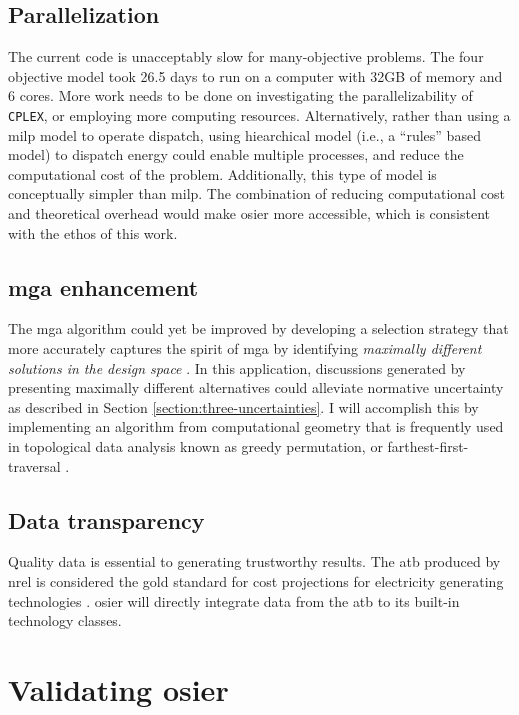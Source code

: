 \subsection{Parallelization}

The current code is unacceptably slow for many-objective problems. The four
objective model took 26.5 days to run on a computer with 32GB of memory and 6
cores. More work needs to be done on investigating the parallelizability of
\texttt{CPLEX}, or employing more computing resources. Alternatively, rather
than using a \ac{milp} model to operate dispatch, using hiearchical model (i.e.,
a ``rules'' based model) to dispatch energy could enable multiple processes, and
reduce the computational cost of the problem. Additionally, this type of model
is conceptually simpler than \ac{milp}. The combination of reducing
computational cost and theoretical overhead would make \ac{osier} more
accessible, which is consistent with the ethos of this work.


\subsection{\ac{mga} enhancement}

The \ac{mga} algorithm could yet be improved by developing a selection strategy
that more accurately captures the spirit of \ac{mga} by identifying 
\textit{maximally different solutions in the design space} 
\cite{decarolis_using_2011,yue_review_2018}. In this application, discussions
generated by presenting maximally different alternatives could alleviate
normative uncertainty as described in Section \ref{section:three-uncertainties}.
I will accomplish this by implementing an algorithm from computational geometry
that is frequently used in topological data analysis known as greedy
permutation, or farthest-first-traversal
\cite{cavanna_geometric_2015,eppstein_approximate_2020}.


\subsection{Data transparency}

Quality data is essential to generating trustworthy results. The \ac{atb}
produced by \ac{nrel} is considered the gold standard for cost projections for
electricity generating technologies \cite{nrel_2020_2020}. \ac{osier} will
directly integrate data from the \ac{atb} to its built-in technology classes.


\section{Validating \ac{osier}}

